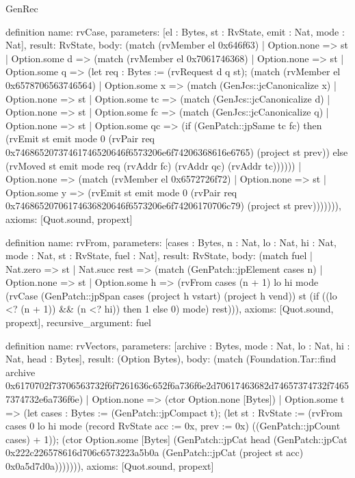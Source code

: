 \begin{lexlean}{GenRec}
\begin{semanticmodule}
definition{
  name: rvCase,
  parameters: [el : Bytes, st : RvState, emit : Nat, mode : Nat],
  result: RvState,
  body: (match (rvMember el 0x646f63)
    | Option.none => st
    | Option.some d => (match (rvMember el 0x7061746368)
      | Option.none => st
      | Option.some q => (let req : Bytes := (rvRequest d q st); (match (rvMember el 0x6578706563746564)
        | Option.some x => (match (GenJcs::jcCanonicalize x)
          | Option.none => st
          | Option.some tc => (match (GenJcs::jcCanonicalize d)
            | Option.none => st
            | Option.some fc => (match (GenJcs::jcCanonicalize q)
              | Option.none => st
              | Option.some qc => (if (GenPatch::jpSame tc fc) then (rvEmit st emit mode 0 (rvPair req 0x74686520737461746520646f6573206e6f74206368616e6765) (project st prev)) else (rvMoved st emit mode req (rvAddr fc) (rvAddr qc) (rvAddr tc))))))
        | Option.none => (match (rvMember el 0x6572726f72)
          | Option.none => st
          | Option.some y => (rvEmit st emit mode 0 (rvPair req 0x74686520706174636820646f6573206e6f74206170706c79) (project st prev))))))),
  axioms: [Quot.sound, propext]
}

definition{
  name: rvFrom,
  parameters: [cases : Bytes, n : Nat, lo : Nat, hi : Nat, mode : Nat, st : RvState, fuel : Nat],
  result: RvState,
  body: (match fuel
    | Nat.zero => st
    | Nat.succ rest => (match (GenPatch::jpElement cases n)
      | Option.none => st
      | Option.some h => (rvFrom cases (n + 1) lo hi mode (rvCase (GenPatch::jpSpan cases (project h vstart) (project h vend)) st (if ((lo <? (n + 1)) && (n <? hi)) then 1 else 0) mode) rest))),
  axioms: [Quot.sound, propext],
  recursive_argument: fuel
}

definition{
  name: rvVectors,
  parameters: [archive : Bytes, mode : Nat, lo : Nat, hi : Nat, head : Bytes],
  result: (Option Bytes),
  body: (match (Foundation.Tar::find archive 0x6170702f73706563732f6f7261636c652f6a736f6e2d70617463682d74657374732f74657374732e6a736f6e)
    | Option.none => (ctor Option.none [Bytes])
    | Option.some t => (let cases : Bytes := (GenPatch::jpCompact t); (let st : RvState := (rvFrom cases 0 lo hi mode (record RvState {acc := 0x, prev := 0x}) ((GenPatch::jpCount cases) + 1)); (ctor Option.some [Bytes] (GenPatch::jpCat head (GenPatch::jpCat 0x222c226578616d706c6573223a5b0a (GenPatch::jpCat (project st acc) 0x0a5d7d0a))))))),
  axioms: [Quot.sound, propext]
}
\end{semanticmodule}
\end{lexlean}
